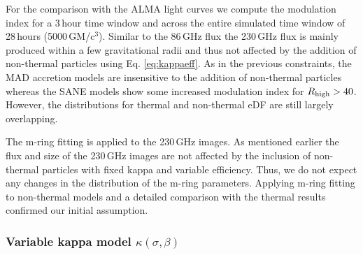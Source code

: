
For the comparison with the ALMA light curves we compute the modulation index for a 3\,hour time window and across the entire simulated time window of 28\,hours (5000\,GM/c$^3$). Similar to the 86\,GHz flux the 230\,GHz flux is mainly produced within a few gravitational radii and thus not affected by the addition of non-thermal particles using Eq. \ref{eq:kappaeff}. As in the previous constraints, the MAD accretion models are insensitive to the addition of non-thermal particles whereas the SANE models show some increased modulation index for $R_\mathrm{high}>40$. However, the distributions for thermal and non-thermal eDF are still largely overlapping.


The m-ring fitting is applied to the 230\,GHz images. As mentioned earlier the flux and size of the 230\,GHz images are not affected by the inclusion of non-thermal particles with fixed kappa and variable efficiency. Thus, we do not expect any changes in the distribution of the m-ring parameters.  Applying m-ring fitting to non-thermal models and a detailed comparison with the thermal results confirmed our initial assumption. 

\subsubsection{Variable kappa model $\kappa(\sigma,\beta)$}


